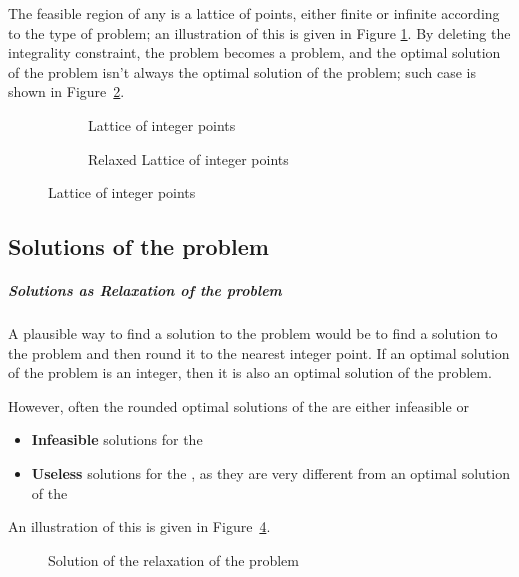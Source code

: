 \documentclass[english]{article}
\begin{document}
\bigskip
The feasible region of any \ILP is a lattice of points, either finite or infinite according to the type of problem;
an illustration of this is given in Figure \ref{subfig:integer-lattice}.
By deleting the integrality constraint, the \ILP problem becomes a \LP problem, and the optimal solution of the \ILP problem isn't always the optimal solution of the \LP problem;
such case is shown in Figure~\ref{subfig:integer-lattice-relaxed}.

\begin{figure}[htbp]
  \centering
  \bigskip
  \begin{subfigure}[b]{0.495\textwidth}
    \centering
    \caption{Lattice of integer points}
    \label{subfig:integer-lattice}
  \end{subfigure}
  \begin{subfigure}[b]{0.495\textwidth}
    \centering
    \caption{Relaxed Lattice of integer points}
    \label{subfig:integer-lattice-relaxed}
  \end{subfigure}
  \caption{Lattice of integer points}
  \label{fig:integer-lattice}
  \bigskip
\end{figure}

\subsection{Solutions of the \ILP problem}

\subparagraph*{Solutions as Relaxation of the \LP problem}
A plausible way to find a solution to the \ILP problem would be to find a solution to the \LP problem and then round it to the nearest integer point.
If an optimal solution of the \LP problem is an integer, then it is also an optimal solution of the \ILP problem.

However, often the rounded optimal solutions of the \LP are either infeasible or

\begin{itemize}
  \item \textbf{Infeasible} solutions for the \ILP
  \item \textbf{Useless} solutions for the \ILP, as they are very different from an optimal solution of the \ILP
\end{itemize}

An illustration of this is given in Figure~\ref{fig:solution-relaxation-ilp}.

\begin{figure}[htbp]
  \centering
  \bigskip
  \caption{Solution of the \LP relaxation of the \ILP problem}
  \label{fig:solution-relaxation-ilp}
  \bigskip
\end{figure}
\end{document}
